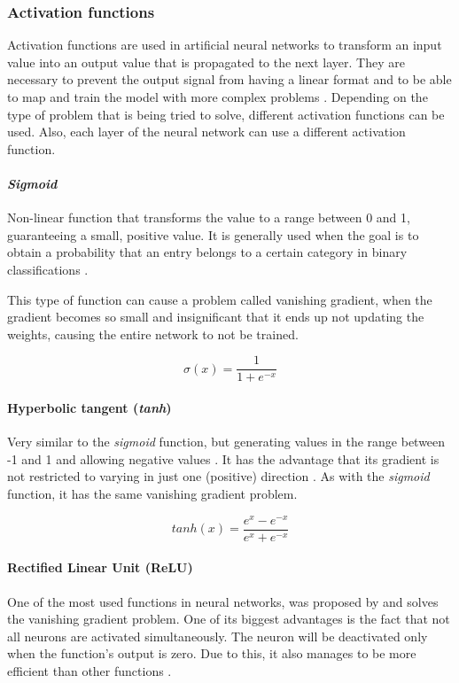 \documentclass[a4paper,fleqn]{cas-sc}
\begin{document}
\subsubsection{Activation functions}
Activation functions are used in artificial neural networks to transform an input value into an output value that is propagated to the next layer. They are necessary to prevent the output signal from having a linear format and to be able to map and train the model with more complex problems \cite{sharma2020}. Depending on the type of problem that is being tried to solve, different activation functions can be used. Also, each layer of the neural network can use a different activation function.

\paragraph{\textit{Sigmoid}}
Non-linear function that transforms the value to a range between 0 and 1, guaranteeing a small, positive value. It is generally used when the goal is to obtain a probability that an entry belongs to a certain category in binary classifications \cite{sharma2020}.

This type of function can cause a problem called vanishing gradient, when the gradient becomes so small and insignificant that it ends up not updating the weights, causing the entire network to not be trained.

\begin{equation}
\label{eq:sigmoid}
\sigma(x) = \frac{1}{1 + e^{-x}}
\end{equation}

\paragraph{Hyperbolic tangent (\textit{tanh})}
Very similar to the \textit{sigmoid} function, but generating values in the range between -1 and 1 and allowing negative values \cite{heaton2015}. It has the advantage that its gradient is not restricted to varying in just one (positive) direction \cite{sharma2020}. As with the \textit{sigmoid} function, it has the same vanishing gradient problem.

\begin{equation}
\label{eq:tanh}
tanh(x) = \frac{e^x - e^{-x}}{e^x + e^{-x}}
\end{equation}

\paragraph{Rectified Linear Unit (ReLU)}
One of the most used functions in neural networks, was proposed by  and solves the vanishing gradient problem. One of its biggest advantages is the fact that not all neurons are activated simultaneously. The neuron will be deactivated only when the function's output is zero. Due to this, it also manages to be more efficient than other functions \cite{sharma2020, nwankpa2018activation}.
\end{document}
